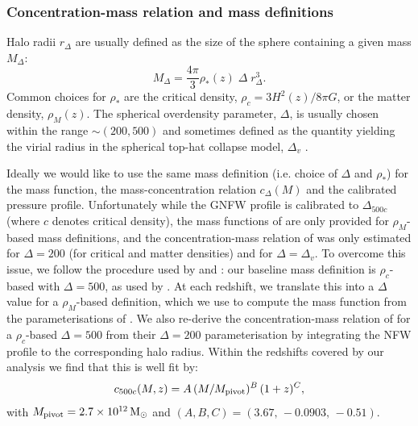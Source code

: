 \documentclass[useAMS,usenatbib]{mn2e}
\begin{document}
    \subsubsection{Concentration-mass relation and mass definitions}\label{sssec:theory.hm.cm}
      Halo radii $r_\Delta$ are usually defined as the size of the sphere containing a given mass $M_\Delta$:
      \begin{equation}
        M_\Delta = \frac{4\pi}{3}\rho_*(z) \; \Delta \; r^3_\Delta.
      \end{equation}
      Common choices for $\rho_*$ are the critical density, $\rho_c=3H^2(z)/8\pi G$, or the matter density, $\rho_M(z)$. The spherical overdensity parameter, $\Delta$, is usually chosen within the range $\sim(200,500)$ and sometimes defined as the quantity yielding the virial radius in the spherical top-hat collapse model, $\Delta_v$ \citep{1998ApJ...495...80B}.

      Ideally we would like to use the same mass definition (i.e. choice of $\Delta$ and $\rho_*$) for the mass function, the mass-concentration relation $c_\Delta(M)$ and the calibrated pressure profile. Unfortunately while the GNFW profile is calibrated to $\Delta_{500c}$ (where $c$ denotes critical density), the mass functions of \cite{2008ApJ...688..709T,2010ApJ...724..878T} are only provided for $\rho_M$-based mass definitions, and the concentration-mass relation of \cite{2008MNRAS.390L..64D} was only estimated for $\Delta=200$ (for critical and matter densities) and for $\Delta=\Delta_v$. To overcome this issue, we follow the procedure used by \cite{2016A&A...594A..24P} and \cite{2018MNRAS.477.4957B}: our baseline mass definition is $\rho_c$-based with $\Delta=500$, as used by \cite{2010A&A...517A..92A}. At each redshift, we translate this into a $\Delta$ value for a $\rho_M$-based definition, which we use to compute the mass function from the parameterisations of \cite{2008ApJ...688..709T,2010ApJ...724..878T}. We also re-derive the concentration-mass relation of \cite{2008MNRAS.390L..64D} for a $\rho_c$-based $\Delta=500$ from their $\Delta=200$ parameterisation by integrating the NFW profile to the corresponding halo radius. Within the redshifts covered by our analysis we find that this is well fit by:
      \begin{equation}
        c_{500c}(M,z)= A\,(M/M_{\rm pivot})^B\,(1+z)^C,
      \end{equation}
      with $M_{\rm pivot}=2.7\times10^{12}\,{\rm M_\odot}$ and $(A,B,C)=(3.67,\,-0.0903,\,-0.51)$.
\end{document}
